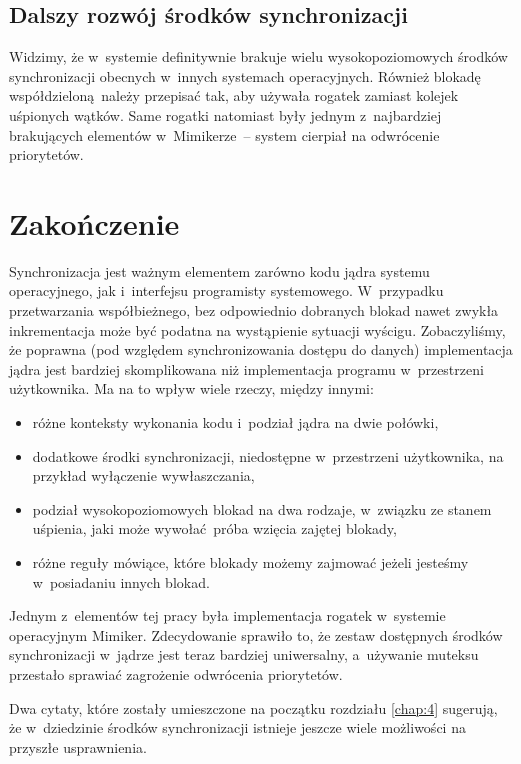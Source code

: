 \documentclass[shortabstract]{iithesis}
\theoremstyle{definition} \newtheorem*{definition}{Definicja}
\theoremstyle{definition} \newtheorem*{example}{Przykład}
\theoremstyle{definition} \newtheorem*{remark}{Uwaga}
\begin{document}
\section{Dalszy rozwój środków synchronizacji}
Widzimy, że w~systemie definitywnie brakuje wielu wysokopoziomowych środków synchronizacji
obecnych w~innych systemach operacyjnych.
Również blokadę współdzieloną należy przepisać tak, aby używała rogatek zamiast kolejek
uśpionych wątków. Same rogatki natomiast były jednym z~najbardziej brakujących elementów w~Mimikerze~--
system cierpiał na odwrócenie priorytetów.

\chapter{Zakończenie}

Synchronizacja jest ważnym elementem zarówno kodu jądra systemu operacyjnego, jak i~interfejsu
programisty systemowego. W~przypadku
przetwarzania współbieżnego, bez odpowiednio dobranych blokad nawet zwykła inkrementacja może być podatna
na wystąpienie sytuacji wyścigu. Zobaczyliśmy, że poprawna (pod względem synchronizowania dostępu
do danych) implementacja jądra jest bardziej skomplikowana niż implementacja programu
w~przestrzeni użytkownika. Ma na to wpływ wiele rzeczy, między innymi:
\begin{itemize}
\item różne konteksty wykonania kodu i~podział jądra na dwie połówki,
\item dodatkowe środki synchronizacji, niedostępne w~przestrzeni użytkownika, na przykład
wyłączenie wywłaszczania,
\item podział wysokopoziomowych blokad na dwa rodzaje, w~związku ze stanem uśpienia, jaki może
wywołać próba wzięcia zajętej blokady,
\item różne reguły mówiące, które blokady możemy zajmować jeżeli jesteśmy w~posiadaniu innych
blokad.
\end{itemize}

Jednym z~elementów tej pracy była implementacja rogatek w~systemie operacyjnym Mimiker. Zdecydowanie
sprawiło to, że zestaw dostępnych środków synchronizacji w~jądrze jest teraz bardziej uniwersalny, a~używanie
muteksu przestało sprawiać zagrożenie odwrócenia priorytetów.

Dwa cytaty, które zostały umieszczone na początku rozdziału \ref{chap:4} sugerują, że w~dziedzinie
środków synchronizacji istnieje jeszcze wiele możliwości na przyszłe usprawnienia.
\end{document}
